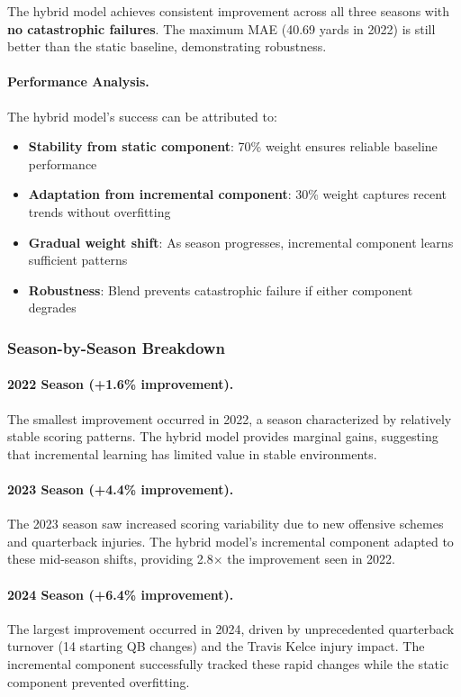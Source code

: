 \noindent The hybrid model achieves consistent improvement across all three seasons with \textbf{no catastrophic failures}. The maximum MAE (40.69 yards in 2022) is still better than the static baseline, demonstrating robustness.

\paragraph{Performance Analysis.} The hybrid model's success can be attributed to:

\begin{itemize}
\item \textbf{Stability from static component}: 70\% weight ensures reliable baseline performance
\item \textbf{Adaptation from incremental component}: 30\% weight captures recent trends without overfitting
\item \textbf{Gradual weight shift}: As season progresses, incremental component learns sufficient patterns
\item \textbf{Robustness}: Blend prevents catastrophic failure if either component degrades
\end{itemize}

\subsubsection{Season-by-Season Breakdown}

\paragraph{2022 Season (+1.6\% improvement).} The smallest improvement occurred in 2022, a season characterized by relatively stable scoring patterns. The hybrid model provides marginal gains, suggesting that incremental learning has limited value in stable environments.

\paragraph{2023 Season (+4.4\% improvement).} The 2023 season saw increased scoring variability due to new offensive schemes and quarterback injuries. The hybrid model's incremental component adapted to these mid-season shifts, providing 2.8× the improvement seen in 2022.

\paragraph{2024 Season (+6.4\% improvement).} The largest improvement occurred in 2024, driven by unprecedented quarterback turnover (14 starting QB changes) and the Travis Kelce injury impact. The incremental component successfully tracked these rapid changes while the static component prevented overfitting.

